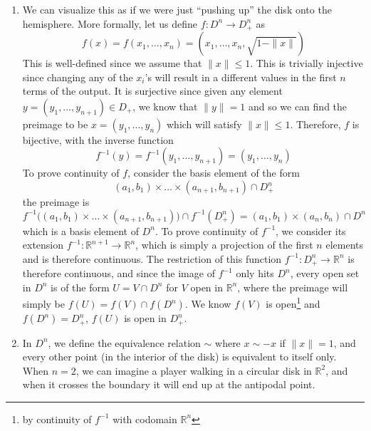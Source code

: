 \begin{solution}
\begin{enumerate}
      \item We can visualize this as if we were just ``pushing up'' the disk onto the hemisphere. More formally, let us define $f: D^n \rightarrow D_+^n$ as 
      \begin{equation}
        f(x) = f(x_1, \ldots, x_n) = (x_1, \ldots, x_n, \sqrt{1 - \|x\|})
      \end{equation}
      This is well-defined since we assume that $\|x\| \leq 1$. This is trivially injective since changing any of the $x_i$'s will result in a different values in the first $n$ terms of the output. It is surjective since given any element $y = (y_1, \ldots, y_{n+1}) \in D_+$, we know that $\|y\| = 1$ and so we can find the preimage to be $x = (y_1, \ldots, y_n)$ which will satisfy $\|x\| \leq 1$. Therefore, $f$ is bijective, with the inverse function 
      \begin{equation}
        f^{-1} (y) = f^{-1} (y_1, \ldots, y_{n+1}) = (y_1, \ldots, y_{n})
      \end{equation}
      To prove continuity of $f$, consider the basis element of the form 
      \begin{equation}
        (a_1, b_1) \times \ldots \times (a_{n+1}, b_{n+1}) \cap D_+^n 
      \end{equation}
      the preimage is 
      \begin{equation}
        f^{-1} \big( (a_1, b_1) \times \ldots \times (a_{n+1}, b_{n+1})\big) \cap f^{-1} (D_+^n) = (a_1, b_1) \times (a_n, b_n) \cap D^n 
      \end{equation}
      which is a basis element of $D^n$. To prove continuity of $f^{-1}$, we consider its extension $f^{-1}: \mathbb{R}^{n+1} \rightarrow \mathbb{R}^n$, which is simply a projection of the first $n$ elements and is therefore continuous. The restriction of this function $f^{-1}: D_+^n \rightarrow \mathbb{R}^n$ is therefore continuous, and since the image of $f^{-1}$ only hits $D^n$, every open set in $D^n$ is of the form $U = V \cap D^n$ for $V$ open in $\mathbb{R}^n$, where the preimage will simply be $f(U) = f(V) \cap f(D^n)$. We know $f(V)$ is open\footnote{by continuity of $f^{-1}$ with codomain $\mathbb{R}^n$} and $f(D^n) = D^n_+$, $f(U)$ is open in $D_+^n$. 

      \item In $D^n$, we define the equivalence relation $\sim$ where $x \sim -x$ if $\|x\| = 1$, and every other point (in the interior of the disk) is equivalent to itself only. When $n=2$, we can imagine a player walking in a circular disk in $\mathbb{R}^2$, and when it crosses the boundary it will end up at the antipodal point. 
    \end{enumerate}
  \end{solution}

